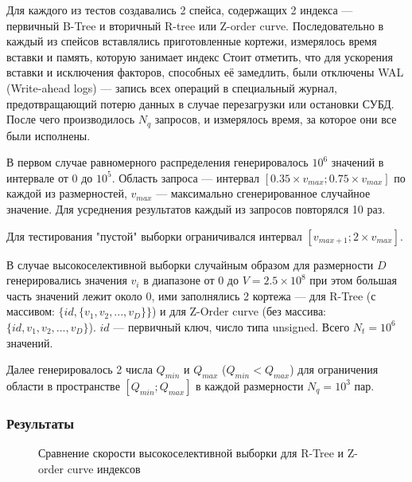 Для каждого из тестов создавались 2 спейса,
содержащих 2 индекса --- первичный B-Tree и вторичный R-tree или Z-order curve. Последовательно в каждый из спейсов вставлялись приготовленные кортежи,
измерялось время вставки и память, которую занимает индекс
Стоит отметить, что для ускорения вставки и исключения факторов,
способных её замедлить, были отключены WAL (Write-ahead logs) ---
запись всех операций в специальный журнал, предотвращающий потерю данных в случае перезагрузки или остановки СУБД.
После чего производилось $N_{q}$ запросов,
и измерялось время, за которое они все были исполнены.

В первом случае равномерного распределения генерировалось $10^6$ значений в интервале
от $0$ до $10^5$.
Область запроса --- интервал $[0.35 \times v_{max}; 0.75 \times v_{max}]$ по каждой из размерностей, $v_{max}$ --- максимально сгенерированное случайное значение. Для усреднения результатов каждый из запросов повторялся 10 раз.

Для тестирования "пустой" выборки ограничивался интервал $[v_{max + 1}; 2 \times v_{max}]$.

В случае высокоселективной выборки случайным образом для размерности $D$ генерировались значения $v_i$ в диапазоне от $0$ до $V = 2.5 \times 10^8$ при этом большая часть значений лежит около 0,
ими заполнялись 2 кортежа --- для R-Tree (с массивом: $\{id, \{v_1, v_2, ..., v_D\}\}$) и для Z-Order curve (без массива: $\{id, v_1, v_2, ..., v_D\}$). $id$ --- первичный ключ, число типа unsigned.
Всего $N_{t} = 10^6$ значений.

Далее генерировалось 2 числа $Q_{min}$ и $Q_{max}$ ($Q_{min} < Q_{max}$) для ограничения области в пространстве $[Q_{min}; Q_{max}]$ в каждой размерности $N_{q} = 10^3$ пар.

\subsubsection{Результаты}

\begin{figure}
	\centering
	\label{img:select_rtree_normal}
	\caption{Сравнение скорости высокоселективной выборки для R-Tree и Z-order curve индексов}
\end{figure}

